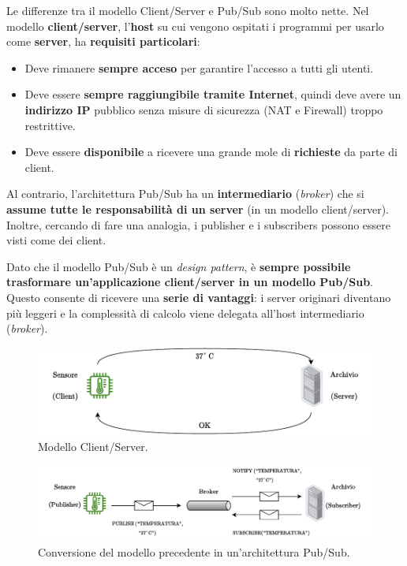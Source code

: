\documentclass[a4paper]{article}
\begin{document}
	Le differenze tra il modello Client/Server e Pub/Sub sono molto nette. Nel modello \textbf{client/server}, l'\textbf{host} su cui vengono ospitati i programmi per usarlo come \textbf{server}, ha \textbf{requisiti particolari}:
	\begin{itemize}
		\item Deve rimanere \textbf{sempre acceso} per garantire l'accesso a tutti gli utenti.
		
		\item Deve essere \textbf{sempre raggiungibile tramite Internet}, quindi deve avere un \textbf{indirizzo IP} pubblico senza misure di sicurezza (NAT e Firewall) troppo restrittive.
		
		\item Deve essere \textbf{disponibile} a ricevere una grande mole di \textbf{richieste} da parte di client.
	\end{itemize}
	Al contrario, l'architettura Pub/Sub ha un \textbf{intermediario} (\emph{broker}) che si \textbf{assume tutte le responsabilità di un server} (in un modello client/server). Inoltre, cercando di fare una analogia, i publisher e i subscribers possono essere visti come dei client.\newline
	
	\noindent
	Dato che il modello Pub/Sub è un \emph{design pattern}, è \textbf{sempre possibile trasformare un'applicazione client/server in un modello Pub/Sub}. Questo consente di ricevere una \textbf{serie di vantaggi}: i server originari diventano più leggeri e la complessità di calcolo viene delegata all'host intermediario (\emph{broker}).
	\begin{figure}[!htp]
		\centering
		\includegraphics[width=\textwidth]{img/pub-sub/convert_client-server_pub-sub-2.pdf}
		\caption{Modello Client/Server.}
	\end{figure}
	
	\begin{figure}[!htp]
		\centering
		\includegraphics[width=\textwidth]{img/pub-sub/convert_client-server_pub-sub-1.pdf}
		\caption{Conversione del modello precedente in un'architettura Pub/Sub.}
	\end{figure}\newpage
	
\end{document}
